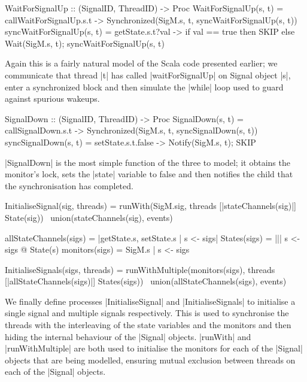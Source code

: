 \begin{cspm}[caption={The CSP model of the {\scalastyle waitForSignalUp} function of the {\scalastyle Signal} object}]
WaitForSignalUp :: (SignalID, ThreadID) -> Proc  
WaitForSignalUp(s, t) = 
  callWaitForSignalUp.s.t -> Synchronized(SigM.s, t, syncWaitForSignalUp(s, t))        
syncWaitForSignalUp(s, t) = 
  getState.s.t?val -> if val == true then  SKIP 
                      else Wait(SigM.s, t); syncWaitForSignalUp(s, t)
\end{cspm}

Again this is a fairly natural model of the Scala code presented earlier; we communicate that thread |t| has called |waitForSignalUp| on Signal object |s|, enter a synchronized block and then simulate the \inlineScala|while| \inlineCSP loop used to guard against spurious wakeups.

\begin{cspm}[caption={The CSP model of the {\scalastyle signalDown} function of the {\scalastyle Signal} object}]
SignalDown :: (SignalID, ThreadID) -> Proc
SignalDown(s, t) = callSignalDown.s.t -> Synchronized(SigM.s, t, syncSignalDown(s, t))
syncSignalDown(s, t) = setState.s.t.false -> Notify(SigM.s, t); SKIP
\end{cspm}

|SignalDown| is the most simple function of the three to model; it obtains the monitor's lock, sets the |state| variable to false and then notifies the child that the synchronisation has completed.

\begin{cspm}[caption={The initialisation of the {\scalastyle Signal} objects, }]
InitialiseSignal(sig, threads) = 
  runWith(SigM.sig, threads [|stateChannels(sig)|] State(sig)) 
      \ union(stateChannels(sig), events)

allStateChannels(sigs) = {|getState.s, setState.s | s <- sigs|}
States(sigs) = ||| s <- sigs @ State(s)
monitors(sigs) = {SigM.s | s <- sigs}

InitialiseSignals(sigs, threads) = 
  runWithMultiple(monitors(sigs), threads [|allStateChannels(sigs)|] States(sigs))  
      \ union(allStateChannels(sigs), events)
\end{cspm}

We finally define processes |InitialiseSignal| and |InitialiseSignals| to initialise a single signal and multiple signals respectively. This is used to synchronise the threads with the interleaving of the state variables and the monitors and then hiding the internal behaviour of the |Signal| objects. |runWith| and |runWithMultiple| are both used to initialise the monitors for each of the |Signal| objects that are being modelled, ensuring mutual exclusion between threads on each of the |Signal| objects.

